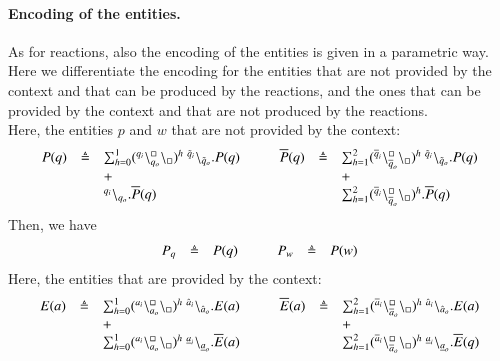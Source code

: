 \paragraph{Encoding of the entities.}
As for reactions, also the encoding of the entities is given in a parametric way.
Here we differentiate the encoding for the entities that are not provided by the context and that can be produced by the reactions, and the ones that can be provided by the context and that are not produced by the reactions.\\
Here, the entities $p$ and $w$ that are not provided by the context:
\[
\begin{array}{lcl@{\hspace{1cm}}lcl}
P (q)&\defeq & \sum_{h=0}^1 (\startchain{q_i}\chainedlink{q_o}{\noact}\chainend{\noact})^h\ \link{\tilde{q}_i}{\tilde{q}_o}.P(q) &
\overline{P} (q)&\defeq & \sum_{h=1}^2 (\startchain{\overline{q}_i}\chainedlink{\overline{q}_o}{\noact}\chainend{\noact})^h\ \link{\tilde{q}_i}{\tilde{q}_o}.P(q)\\
&& + & && +\\
&& \link{q_i}{q_o}.\overline{P}(q) &
&& \sum_{h=1}^2 (\startchain{\overline{q}_i}\chainedlink{\overline{q}_o}{\noact}\chainend{\noact})^h.\overline{P}(q)\\
\end{array}
\]
Then, we have
\[
\begin{array}{lcl @{\hspace{1cm}}lcl}
P_q & \defeq & P(q) & P_w& \defeq & P(w)\\
\end{array}
\]
Here, the entities that are provided by the context:
\[
\begin{array}{lcl @{\hspace{1cm}}lcl}
E(a) & \defeq &  \sum_{h=0}^1 (\startchain{a_i}\chainedlink{a_o}{\noact}\chainend{\noact})^h\ \link{\hat{a}_i}{\hat{a}_o}.E(a) &  \overline{E} (a)&\defeq & \sum_{h=1}^2 (\startchain{\overline{a}_i}\chainedlink{\overline{a}_o}{\noact}\chainend{\noact})^h\ \link{\hat{a}_i}{\hat{a}_o}.E(a)\\
&& + &  && +\\
&& \sum_{h=0}^1 (\startchain{a_i}\chainedlink{a_o}{\noact}\chainend{\noact})^h\ \link{\underline{a}_i}{\underline{a}_o}.\overline{E}(a) &
&& \sum_{h=1}^2 (\startchain{\overline{a}_i}\chainedlink{\overline{a}_o}{\noact}\chainend{\noact})^h\ \link{\underline{a}_i}{\underline{a}_o}.\overline{E}(q)\\
\end{array}
\]
